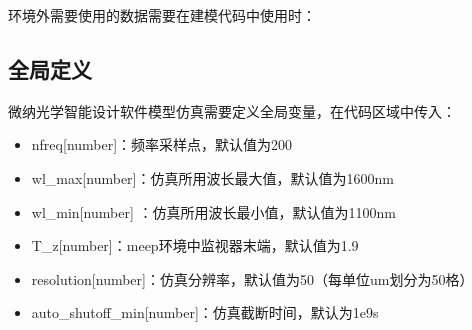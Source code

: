 \documentclass[a4paper,10pt,english]{sphinxmanual}
\begin{document}
{{{{{{\begin{itemize}
\end{itemize}

\begin{sphinxVerbatim}[commandchars=\\\{\}]
\end{sphinxVerbatim}

\sphinxAtStartPar
环境外需要使用的数据需要在建模代码中使用时：

\begin{sphinxVerbatim}[commandchars=\\\{\}]
   
\end{sphinxVerbatim}


\subsection{全局定义}
\label{\detokenize{_u8f6f_u4ef6API_u63a5_u53e3/_u4eff_u771f/_u4eff_u771f:id3}}
\sphinxAtStartPar
微纳光学智能设计软件模型仿真需要定义全局变量，在代码区域中传入：
\begin{itemize}
\item {} 
\sphinxAtStartPar
nfreq{[}number{]}：频率采样点，默认值为200

\item {} 
\sphinxAtStartPar
wl\_max{[}number{]}：仿真所用波长最大值，默认值为1600nm

\item {} 
\sphinxAtStartPar
wl\_min{[}number{]} ：仿真所用波长最小值，默认值为1100nm

\item {} 
\sphinxAtStartPar
T\_z{[}number{]}：meep环境中监视器末端，默认值为1.9

\item {} 
\sphinxAtStartPar
resolution{[}number{]}：仿真分辨率，默认值为50（每单位um划分为50格）

\item {} 
\sphinxAtStartPar
auto\_shutoff\_min{[}number{]}：仿真截断时间，默认为1e\sphinxhyphen{}9s


\end{itemize}}}}}}}
\end{document}
